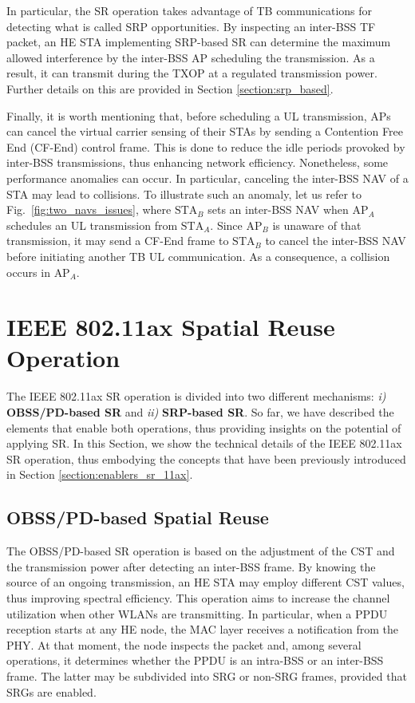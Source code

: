 \documentclass[comsoc]{IEEEtran}
\begin{document}
	In particular, the SR operation takes advantage of TB communications for detecting what is called SRP opportunities. By inspecting an inter-BSS TF packet, an HE STA implementing SRP-based SR can determine the maximum allowed interference by the inter-BSS AP scheduling the transmission. As a result, it can transmit during the TXOP at a regulated transmission power. Further details on this are provided in Section \ref{section:srp_based}.
	
	Finally, it is worth mentioning that, before scheduling a UL transmission, APs can cancel the virtual carrier sensing of their STAs by sending a Contention Free End (CF-End) control frame. This is done to reduce the idle periods provoked by inter-BSS transmissions, thus enhancing network efficiency. Nonetheless, some performance anomalies can occur. In particular, canceling the inter-BSS NAV of a STA may lead to collisions. To illustrate such an anomaly, let us refer to Fig.~\ref{fig:two_navs_issues}, where $\text{STA}_{B}$ sets an inter-BSS NAV when $\text{AP}_{A}$ schedules an UL transmission from $\text{STA}_{A}$. Since $\text{AP}_{B}$ is unaware of that transmission, it may send a CF-End frame to $\text{STA}_{B}$ to cancel the inter-BSS NAV before initiating another TB UL communication. As a consequence, a collision occurs in $\text{AP}_{A}$.
	
	
	\section{IEEE 802.11ax Spatial Reuse Operation}
	\label{section:operation_sr_11ax}
	The IEEE 802.11ax SR operation is divided into two different mechanisms: \emph{i)} \textbf{OBSS/PD-based SR} and \emph{ii)} \textbf{SRP-based SR}. So far, we have described the elements that enable both operations, thus providing insights on the potential of applying SR. In this Section, we show the technical details of the IEEE 802.11ax SR operation, thus embodying the concepts that have been previously introduced in Section \ref{section:enablers_sr_11ax}.
	
	\subsection{OBSS/PD-based Spatial Reuse}
	\label{section:obss_pd_based}
	The OBSS/PD-based SR operation is based on the adjustment of the CST and the transmission power after detecting an inter-BSS frame. By knowing the source of an ongoing transmission, an HE STA may employ different CST values, thus improving spectral efficiency. This operation aims to increase the channel utilization when other WLANs are transmitting. In particular, when a PPDU reception starts at any HE node, the MAC layer receives a notification from the PHY. At that moment, the node inspects the packet and, among several operations, it determines whether the PPDU is an intra-BSS or an inter-BSS frame. The latter may be subdivided into SRG or non-SRG frames, provided that SRGs are enabled.
	
\end{document}
